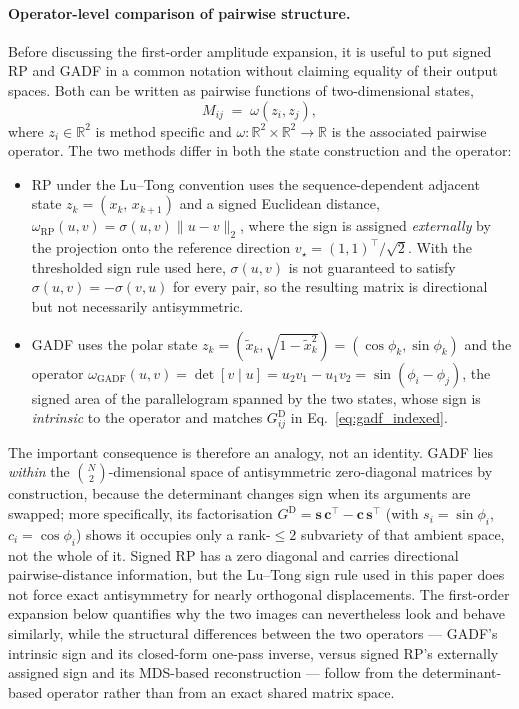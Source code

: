 \documentclass[10pt,a4paper,parskip=half-]{scrartcl}
\begin{document}
\paragraph*{Operator-level comparison of pairwise structure.}
Before discussing the first-order amplitude expansion, it is useful to put signed RP and GADF in a common notation without claiming equality of their output spaces. Both can be written as pairwise functions of two-dimensional states,
\[
M_{ij} \;=\; \omega(z_i,z_j),
\]
where $z_i\in\mathbb{R}^{2}$ is method specific and $\omega:\mathbb{R}^{2}\times\mathbb{R}^{2}\to\mathbb{R}$ is the associated pairwise operator. The two methods differ in both the state construction and the operator:
\begin{itemize}
  \item RP under the Lu--Tong convention uses the sequence-dependent adjacent state \(z_k=(x_k,\,x_{k+1})\) and a signed Euclidean distance, \(\omega_{\text{RP}}(u,v)=\sigma(u,v)\lVert u-v\rVert_{2}\), where the sign is assigned \emph{externally} by the projection onto the reference direction \(v_{\star}=(1,1)^{\top}/\sqrt{2}\). With the thresholded sign rule used here, \(\sigma(u,v)\) is not guaranteed to satisfy \(\sigma(u,v)=-\sigma(v,u)\) for every pair, so the resulting matrix is directional but not necessarily antisymmetric.
  \item GADF uses the polar state \(z_k=(\tilde x_k,\sqrt{1-\tilde x_k^{2}})=(\cos\phi_k,\sin\phi_k)\) and the operator \(\omega_{\text{GADF}}(u,v)=\det[v\mid u]=u_{2}v_{1}-u_{1}v_{2}=\sin(\phi_i-\phi_j)\), the signed area of the parallelogram spanned by the two states, whose sign is \emph{intrinsic} to the operator and matches \(G^{\mathrm{D}}_{ij}\) in Eq.~\eqref{eq:gadf_indexed}.
\end{itemize}
The important consequence is therefore an analogy, not an identity. GADF lies \emph{within} the $\binom{N}{2}$-dimensional space of antisymmetric zero-diagonal matrices by construction, because the determinant changes sign when its arguments are swapped; more specifically, its factorisation $G^{\mathrm{D}}=\mathbf{s}\,\mathbf{c}^{\top}-\mathbf{c}\,\mathbf{s}^{\top}$ (with $s_i=\sin\phi_i$, $c_i=\cos\phi_i$) shows it occupies only a rank-$\leq 2$ subvariety of that ambient space, not the whole of it. Signed RP has a zero diagonal and carries directional pairwise-distance information, but the Lu--Tong sign rule used in this paper does not force exact antisymmetry for nearly orthogonal displacements. The first-order expansion below quantifies why the two images can nevertheless look and behave similarly, while the structural differences between the two operators --- GADF's intrinsic sign and its closed-form one-pass inverse, versus signed RP's externally assigned sign and its MDS-based reconstruction --- follow from the determinant-based operator rather than from an exact shared matrix space.
\end{document}
